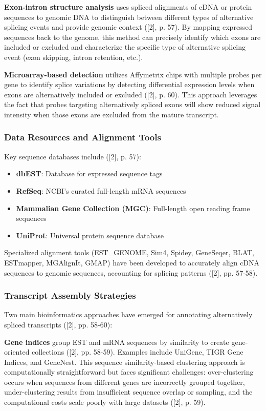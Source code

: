\documentclass[12pt,a4paper]{article}
\begin{document}
\textbf{Exon-intron structure analysis} uses spliced alignments of cDNA or protein sequences to genomic DNA to distinguish between different types of alternative splicing events and provide genomic context ([2], p. 57). By mapping expressed sequences back to the genome, this method can precisely identify which exons are included or excluded and characterize the specific type of alternative splicing event (exon skipping, intron retention, etc.).

\textbf{Microarray-based detection} utilizes Affymetrix chips with multiple probes per gene to identify splice variations by detecting differential expression levels when exons are alternatively included or excluded ([2], p. 60). This approach leverages the fact that probes targeting alternatively spliced exons will show reduced signal intensity when those exons are excluded from the mature transcript.

\subsubsection{Data Resources and Alignment Tools}

Key sequence databases include ([2], p. 57):
\begin{itemize}
    \item \textbf{dbEST}: Database for expressed sequence tags
    \item \textbf{RefSeq}: NCBI's curated full-length mRNA sequences
    \item \textbf{Mammalian Gene Collection (MGC)}: Full-length open reading frame sequences
    \item \textbf{UniProt}: Universal protein sequence database
\end{itemize}

Specialized alignment tools (EST\_GENOME, Sim4, Spidey, GeneSeqer, BLAT, ESTmapper, MGAlignIt, GMAP) have been developed to accurately align cDNA sequences to genomic sequences, accounting for splicing patterns ([2], pp. 57-58).

\subsubsection{Transcript Assembly Strategies}

Two main bioinformatics approaches have emerged for annotating alternatively spliced transcripts ([2], pp. 58-60):

\textbf{Gene indices} group EST and mRNA sequences by similarity to create gene-oriented collections ([2], pp. 58-59). Examples include UniGene, TIGR Gene Indices, and GeneNest. This sequence similarity-based clustering approach is computationally straightforward but faces significant challenges: over-clustering occurs when sequences from different genes are incorrectly grouped together, under-clustering results from insufficient sequence overlap or sampling, and the computational costs scale poorly with large datasets ([2], p. 59).
\end{document}
